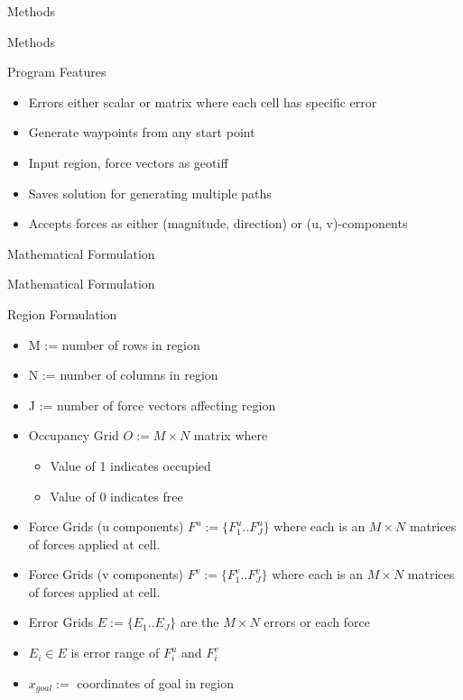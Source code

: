 \documentclass[xcolor=table, 9pt]{beamer}
\begin{document}
\begin{section}{Methods}
\begin{frame}{Methods}
\begin{block}{Program Features}
\begin{itemize}
                \item Errors either scalar or matrix where each cell has specific error
                \item Generate waypoints from any start point
                \item Input region, force vectors as geotiff
                \item Saves solution for generating multiple paths
                \item Accepts forces as either (magnitude, direction) or (u, v)-components
            \end{itemize}
        \end{block}
    \end{frame}
\end{section}
\begin{section}{Mathematical Formulation}
    \begin{frame}{Mathematical Formulation}
        \begin{block}{Region Formulation}
            \begin{itemize}
            \item M := number of rows in region
            \item N := number of columns in region
            \item J := number of force vectors affecting region
            \item Occupancy Grid $O := M \times N$ matrix where
            \begin{itemize}
                \item Value of 1 indicates occupied
                \item Value of 0 indicates free
            \end{itemize}
            \item Force Grids (u components) $F^u := \{F^u_1 .. F^u_J\}$ where each is an $M \times N$ matrices of forces applied at cell.
            \item Force Grids (v components) $F^v := \{F^v_1 .. F^v_J\}$ where each is an $M \times N$ matrices of forces applied at cell.
            \item Error Grids $E := \{E_1 .. E_J \}$ are the $M \times N$ errors or each force
            \item $E_i \in E$ is error range of $F^u_i$ and $F^v_i$
            \item $x_{goal} :=$ coordinates of goal in region

\end{itemize}
\end{block}
\end{frame}
\end{section}
\end{document}
